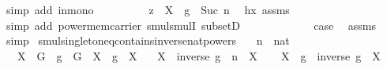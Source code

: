 \begin{isabellebody}
\ {\isacharparenleft}{\kern0pt}simp\ add{\isacharcolon}{\kern0pt}\ in{\isacharunderscore}{\kern0pt}mono{\isacharparenright}{\kern0pt}\isanewline
\ \ \ \ \ \ \isamarkupfalse%
\ \isamarkupfalse%
\ {\isachardoublequoteopen}z\ {\isasymin}\ X\ {\isasymcdots}\ {\isacharbraceleft}{\kern0pt}g\ {\isacharcircum}{\kern0pt}\ Suc\ n{\isacharbraceright}{\kern0pt}{\isachardoublequoteclose}\ \isamarkupfalse%
\ hx\ assms\ \isanewline
\ \ \ \ \ \ \ \ \isamarkupfalse%
\ {\isacharparenleft}{\kern0pt}simp\ add{\isacharcolon}{\kern0pt}\ power{\isacharunderscore}{\kern0pt}mem{\isacharunderscore}{\kern0pt}carrier\ smul{\isachardot}{\kern0pt}smulI\ subsetD{\isacharparenright}{\kern0pt}\isanewline
\ \ \ \ \isamarkupfalse%
\isanewline
\ \ \isamarkupfalse%
\isanewline
\ \ \isamarkupfalse%
\ \isamarkupfalse%
\ {\isacharquery}{\kern0pt}case\ \isamarkupfalse%
\ assms\ \isamarkupfalse%
\ simp\isanewline
{}\isamarkupfalse%
%
\endisatagproof
{\isafoldproof}%
%
\isadelimproof
\isanewline
%
\endisadelimproof
\isanewline
{}\isamarkupfalse%
\ smul{\isacharunderscore}{\kern0pt}singleton{\isacharunderscore}{\kern0pt}eq{\isacharunderscore}{\kern0pt}contains{\isacharunderscore}{\kern0pt}inverse{\isacharunderscore}{\kern0pt}nat{\isacharunderscore}{\kern0pt}powers{\isacharcolon}{\kern0pt}\isanewline
\ \ \ n\ {\isacharcolon}{\kern0pt}{\isacharcolon}{\kern0pt}\ nat\isanewline
\ \ \ {\isachardoublequoteopen}X\ {\isasymsubseteq}\ G{\isachardoublequoteclose}\ \ {\isachardoublequoteopen}g\ {\isasymin}\ G{\isachardoublequoteclose}\ \ {\isachardoublequoteopen}X\ {\isasymcdots}\ {\isacharbraceleft}{\kern0pt}g{\isacharbraceright}{\kern0pt}\ {\isacharequal}{\kern0pt}\ X{\isachardoublequoteclose}\isanewline
\ \ \ {\isachardoublequoteopen}X\ {\isasymcdots}\ {\isacharbraceleft}{\kern0pt}{\isacharparenleft}{\kern0pt}inverse\ g{\isacharparenright}{\kern0pt}\ {\isacharcircum}{\kern0pt}\ n{\isacharbraceright}{\kern0pt}\ {\isacharequal}{\kern0pt}\ X{\isachardoublequoteclose}\isanewline
%
\isadelimproof
%
\endisadelimproof
%
\isatagproof
{}\isamarkupfalse%
{\isacharminus}{\kern0pt}\isanewline
\ \ \isamarkupfalse%
\ {\isachardoublequoteopen}{\isacharparenleft}{\kern0pt}X\ {\isasymcdots}\ {\isacharbraceleft}{\kern0pt}g{\isacharbraceright}{\kern0pt}{\isacharparenright}{\kern0pt}\ {\isasymcdots}\ {\isacharbraceleft}{\kern0pt}inverse\ g{\isacharbraceright}{\kern0pt}\ {\isacharequal}{\kern0pt}\ X{\isachardoublequoteclose}\isanewline

\end{isabellebody}
